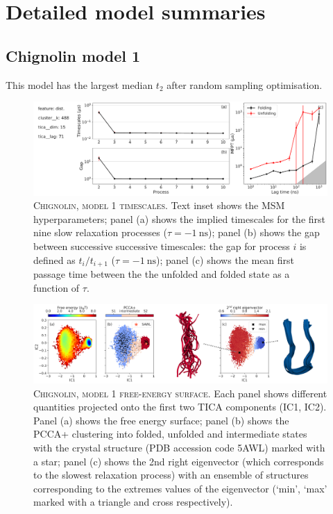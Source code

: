 \documentclass{article}
\begin{document}
\section{Detailed model summaries} 


\subsection{Chignolin model 1}
This model has the largest median $t_{2}$ after random sampling optimisation.

\begin{figure}[h]
    \centering
    \includegraphics[width=\columnwidth]{SI_figures/CLN_52_SI-1.pdf}
    \caption{\textsc{Chignolin, model 1 timescales}.   Text inset shows the MSM hyperparameters; panel (a) shows the implied timescales for the first nine slow relaxation processes ($\tau=\SI{-1}{\nano\second}$); panel (b) shows the gap between successive successive timescales: the gap for process $i$ is defined as $t_{i}/t_{i+1}$ ($\tau=\SI{-1}{\nano\second}$); panel (c) shows the mean first passage time between the the unfolded and folded state as a function of $\tau$.}
    \label{si_fig:CLN_52_1}
\end{figure}

\begin{figure}[h]
    \centering
    \includegraphics[width=\columnwidth]{SI_figures/CLN_52_SI-2.png}
    \caption{\textsc{Chignolin, model 1 free-energy surface}.  Each panel shows different quantities projected onto the first two TICA components (IC1, IC2).  Panel (a) shows the free energy surface; panel (b) shows the PCCA+ clustering into folded, unfolded and intermediate states with the crystal structure (PDB accession code 5AWL) marked with a star; panel (c) shows the 2nd right eigenvector (which corresponds to the slowest relaxation process) with an ensemble of structures corresponding to the extremes values of the eigenvector (`min', `max' marked with a triangle and cross respectively). }
    \label{si_fig:CLN_52_2}
\end{figure}
\end{document}
